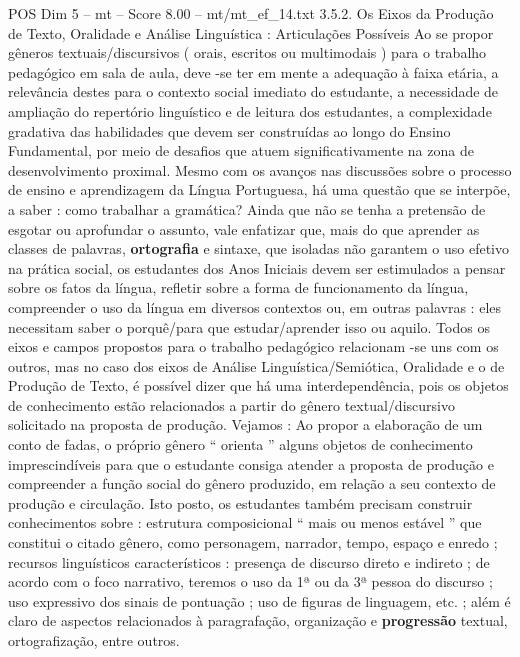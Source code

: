 \begin{textsample}{POS Dim 5 – mt – Score 8.00 – mt/mt\_ef\_14.txt}  \label{ex:f5_pos_088}
3.5.2.
Os Eixos da Produção de Texto, Oralidade e Análise Linguística : Articulações Possíveis Ao se propor gêneros textuais/discursivos ( orais, escritos ou multimodais ) para o trabalho pedagógico em sala de aula, deve -se ter em mente a adequação à faixa etária, a relevância destes para o contexto social imediato do estudante, a necessidade de ampliação do repertório linguístico e de leitura dos estudantes, a complexidade gradativa das habilidades que devem ser construídas ao longo do Ensino Fundamental, por meio de desafios que atuem significativamente na zona de desenvolvimento proximal.
Mesmo com os avanços nas discussões sobre o processo de ensino e aprendizagem da Língua Portuguesa, há uma questão que se interpõe, a saber : como trabalhar a gramática?
Ainda que não se tenha a pretensão de esgotar ou aprofundar o assunto, vale enfatizar que, mais do que aprender as classes de palavras, \textbf{ortografia} e sintaxe, que isoladas não garantem o uso efetivo na prática social, os estudantes dos Anos Iniciais devem ser estimulados a pensar sobre os fatos da língua, refletir sobre a forma de funcionamento da língua, compreender o uso da língua em diversos contextos ou, em outras palavras : eles necessitam saber o porquê/para que estudar/aprender isso ou aquilo.
Todos os eixos e campos propostos para o trabalho pedagógico relacionam -se uns com os outros, mas no caso dos eixos de Análise Linguística/Semiótica, Oralidade e o de Produção de Texto, é possível dizer que há uma interdependência, pois os objetos de conhecimento estão relacionados a partir do gênero textual/discursivo solicitado na proposta de produção.
Vejamos : Ao propor a elaboração de um conto de fadas, o próprio gênero “ orienta ” alguns objetos de conhecimento imprescindíveis para que o estudante consiga atender a proposta de produção e compreender a função social do gênero produzido, em relação a seu contexto de produção e circulação.
Isto posto, os estudantes também precisam construir conhecimentos sobre : estrutura composicional “ mais ou menos estável ” que constitui o citado gênero, como personagem, narrador, tempo, espaço e enredo ; recursos linguísticos característicos : presença de discurso direto e indireto ; de acordo com o foco narrativo, teremos o uso da 1ª ou da 3ª pessoa do discurso ; uso expressivo dos sinais de pontuação ; uso de figuras de linguagem, etc. ; além é claro de aspectos relacionados à paragrafação, organização e \textbf{progressão} textual, ortografização, entre outros.

\end{textsample}

